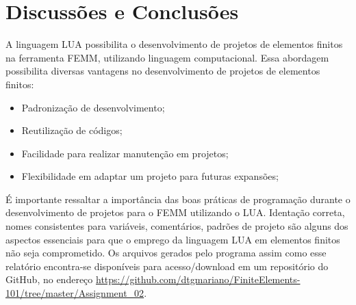\section{Discussões e Conclusões}
A linguagem LUA possibilita o desenvolvimento de projetos de elementos finitos na ferramenta FEMM, utilizando linguagem computacional. Essa abordagem possibilita diversas vantagens no desenvolvimento de projetos de elementos finitos:
\begin{itemize}
  \item Padronização de desenvolvimento;
  \item Reutilização de códigos;
  \item Facilidade para realizar manutenção em projetos;
  \item Flexibilidade em adaptar um projeto para futuras expansões;
\end{itemize}
É importante ressaltar a importância das boas práticas de programação durante o desenvolvimento de projetos para o FEMM utilizando o LUA. Identação correta, nomes consistentes para variáveis, comentários, padrões de projeto são alguns dos aspectos essenciais para que o emprego da linguagem LUA em elementos finitos não seja comprometido. Os arquivos gerados pelo programa assim como esse relatório encontra-se disponíveis para acesso/download em um repositório do GitHub, no endereço \url{https://github.com/dtgmariano/FiniteElements-101/tree/master/Assignment_02}.

